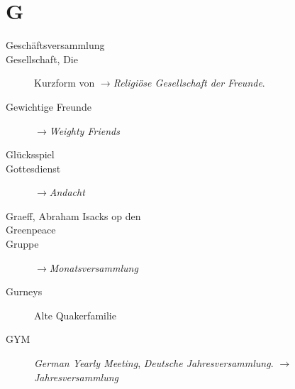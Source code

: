 \section*{G}

\articlesize

\begin{description}
 \item[Geschäftsversammlung]

 \item[Gesellschaft, Die] Kurzform von $\to$\textit{Religiöse Gesellschaft der Freunde}.

\item[Gewichtige Freunde] $\to$\textit{Weighty Friends}

\item[Glücksspiel]

\item[Gottesdienst] $\to$\textit{Andacht}

 \item[Graeff, Abraham Isacks op den]

 \item[Greenpeace]

\item[Gruppe] $\to$\textit{Monatsversammlung}

\item[Gurneys] Alte Quakerfamilie

\item[GYM] \textit{German Yearly Meeting}, \textit{Deutsche Jahresversammlung}. $\to$\textit{Jahresversammlung}
 \end{description}

\normalsize